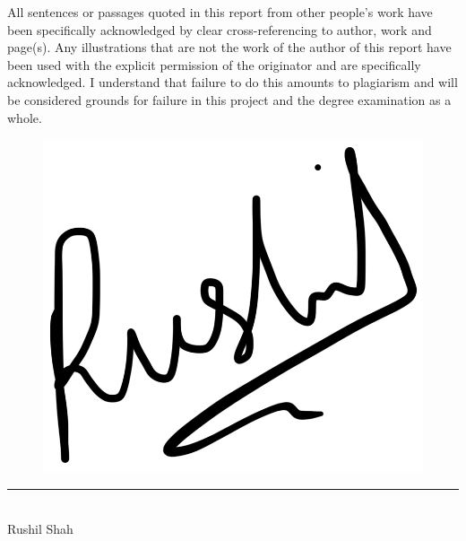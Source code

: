 \documentclass[../main.tex]{subfiles}
\begin{document}
\raggedright

All sentences or passages quoted in this report from other people's work have been specifically acknowledged by clear cross-referencing to author, work and page(s). Any illustrations that are not the work of the author of this report have been used with the explicit permission of the originator and are specifically acknowledged. I understand that failure to do this amounts to plagiarism and will be considered grounds for failure in this project and the degree examination as a whole.\\[16mm]

	\begin{figure}[H]
        {\includegraphics[scale=0.06]
        {images/sign.jpeg}}
      \end{figure}
\noindent\rule{2.5cm}{0.4pt}\\[4mm]
Rushil Shah
\end{document}
